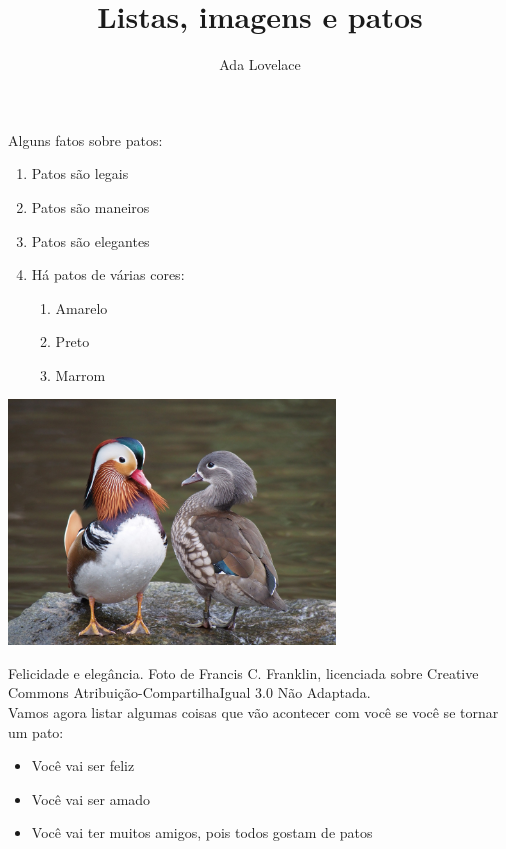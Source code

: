 \documentclass[12pt, a4paper]{article}
\title{Listas, imagens e patos}
\author{Ada Lovelace}
\begin{document}
  \maketitle

  Alguns fatos sobre patos:

  \begin{enumerate}
    \item Patos são legais
    \item Patos são maneiros
    \item Patos são elegantes
    \item Há patos de várias cores:
    \begin{enumerate}
      \item Amarelo
      \item Preto
      \item Marrom
    \end{enumerate}
  \end{enumerate}
  
  \begin{center}
    \includegraphics[width=0.65\textwidth]{duck} 
  \end{center}
  Felicidade e elegância. Foto de Francis C. Franklin, licenciada sobre Creative Commons Atribuição-CompartilhaIgual 3.0 Não Adaptada. \\

  Vamos agora listar algumas coisas que vão acontecer com você se você se tornar um pato:

  \begin{itemize}
    \item Você vai ser feliz
    \item Você vai ser amado
    \item Você vai ter muitos amigos, pois todos gostam de patos
  \end{itemize}
\end{document}
